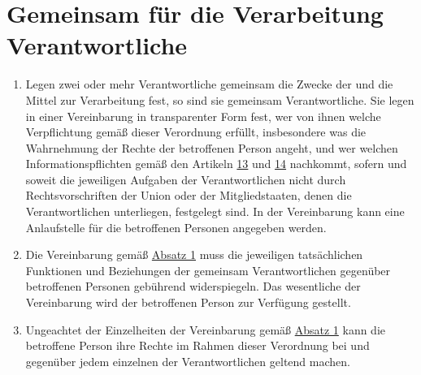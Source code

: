 \chapter{Gemeinsam für die Verarbeitung Verantwortliche}
\label{ch:26}


\begin{enumerate}

  \item Legen zwei oder mehr Verantwortliche gemeinsam die Zwecke der und die Mittel zur Verarbeitung fest, so sind sie
   gemeinsam Verantwortliche. Sie legen in einer Vereinbarung in transparenter Form fest, wer von ihnen welche
   Verpflichtung gemäß dieser Verordnung erfüllt, insbesondere was die Wahrnehmung der Rechte der betroffenen Person
   angeht, und wer welchen Informationspflichten gemäß den Artikeln \hyperref[ch:13]{13} und \hyperref[ch:14]
   {14} nachkommt, sofern und soweit die jeweiligen Aufgaben der Verantwortlichen nicht durch Rechtsvorschriften der
   Union oder der Mitgliedstaaten, denen die Verantwortlichen unterliegen, festgelegt sind. In der Vereinbarung kann
   eine Anlaufstelle für die betroffenen Personen angegeben werden.
  \label{itm:26-1}

  \item Die Vereinbarung gemäß \hyperref[itm:26-1]{Absatz 1} muss die jeweiligen tatsächlichen Funktionen und
   Beziehungen der gemeinsam Verantwortlichen gegenüber betroffenen Personen gebührend widerspiegeln. Das wesentliche
   der Vereinbarung wird der betroffenen Person zur Verfügung gestellt.
  \label{itm:26-2}

  \item Ungeachtet der Einzelheiten der Vereinbarung gemäß \hyperref[itm:26-1]{Absatz 1} kann die betroffene Person ihre
   Rechte im Rahmen dieser Verordnung bei und gegenüber jedem einzelnen der Verantwortlichen geltend machen.
  \label{itm:26-3}

\end{enumerate}


